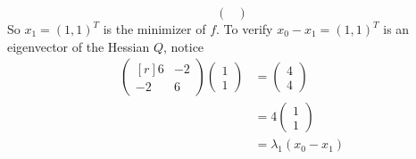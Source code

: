 \documentclass{article}
\begin{document}
\begin{itemize}
\begin{itemize}
\[\begin{pmatrix}
        \end{pmatrix}\]
        So $x_1 = (1,1)^T$ is the minimizer of $f$. To verify $x_0 - x_1 = (1,1)^T$ is an eigenvector of the Hessian $Q$, notice
        \begin{align*}
            \begin{pmatrix*}[r]
                6 & -2\\
                -2 & 6
            \end{pmatrix*}\begin{pmatrix}
                1\\
                1
            \end{pmatrix} &= 
            \begin{pmatrix}
                4\\
                4
            \end{pmatrix}\\
            &= 4\begin{pmatrix}
                1\\
                1
            \end{pmatrix}\\
            &= \lambda_1 (x_0 - x_1)
        \end{align*}    
    \end{itemize}
    


\end{itemize}
\end{document}
